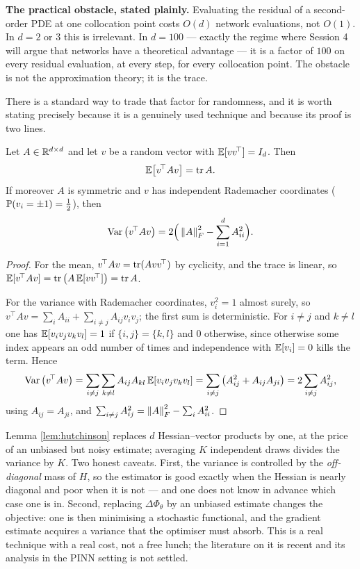 \documentclass[11pt,a4paper]{article}
\begin{document}
\begin{keybox}
\textbf{The practical obstacle, stated plainly.} Evaluating the residual of a second-order PDE at
one collocation point costs $O(d)$ network evaluations, not $O(1)$. In $d = 2$ or $3$ this is
irrelevant. In $d = 100$ --- exactly the regime where Session 4 will argue that networks have a
theoretical advantage --- it is a factor of $100$ on every residual evaluation, at every step, for
every collocation point. The obstacle is not the approximation theory; it is the trace.
\end{keybox}

There is a standard way to trade that factor for randomness, and it is worth stating precisely
because it is a genuinely used technique and because its proof is two lines.

\begin{lemma}\label{lem:hutchinson}
Let $A \in \mathbb{R}^{d\times d}$ and let $v$ be a random vector with $\mathbb{E}[vv^{\!\top}] = I_d$. Then
\[
\mathbb{E}\big[ v^{\!\top} A v \big] = \operatorname{tr} A .
\]
If moreover $A$ is symmetric and $v$ has independent Rademacher coordinates
($\mathbb{P}(v_i = \pm 1) = \tfrac12$), then
\[
\operatorname{Var}\big( v^{\!\top} A v \big) = 2 \Big( \left\lVert A \right\rVert_F^2 - \sum_{i=1}^d A_{ii}^2 \Big).
\]
\end{lemma}

\begin{proof}
For the mean, $v^{\!\top}Av = \operatorname{tr}(A v v^{\!\top})$ by cyclicity, and the trace is linear, so
$\mathbb{E}[v^{\!\top}Av] = \operatorname{tr}\big(A\,\mathbb{E}[vv^{\!\top}]\big) = \operatorname{tr} A$.

For the variance with Rademacher coordinates, $v_i^2 = 1$ almost surely, so
$v^{\!\top}Av = \sum_i A_{ii} + \sum_{i \ne j} A_{ij} v_i v_j$; the first sum is deterministic.
For $i \ne j$ and $k \ne l$ one has $\mathbb{E}[v_iv_jv_kv_l] = 1$ if $\{i,j\} = \{k,l\}$ and $0$ otherwise,
since otherwise some index appears an odd number of times and independence with $\mathbb{E}[v_i] = 0$ kills
the term. Hence
\[
\operatorname{Var}\big(v^{\!\top}Av\big) = \sum_{i \ne j}\sum_{k \ne l} A_{ij}A_{kl}\,\mathbb{E}[v_iv_jv_kv_l]
= \sum_{i\ne j} \big( A_{ij}^2 + A_{ij}A_{ji} \big) = 2\sum_{i \ne j} A_{ij}^2,
\]
using $A_{ij} = A_{ji}$, and $\sum_{i\ne j}A_{ij}^2 = \left\lVert A \right\rVert_F^2 - \sum_i A_{ii}^2$.
\end{proof}

\begin{remark}
Lemma \ref{lem:hutchinson} replaces $d$ Hessian--vector products by one, at the price of an unbiased
but noisy estimate; averaging $K$ independent draws divides the variance by $K$. Two honest
caveats. First, the variance is controlled by the \emph{off-diagonal} mass of $H$, so the estimator
is good exactly when the Hessian is nearly diagonal and poor when it is not --- and one does not
know in advance which case one is in. Second, replacing $\Delta\Phi_\theta$ by an unbiased estimate
changes the objective: one is then minimising a stochastic functional, and the gradient estimate
acquires a variance that the optimiser must absorb. This is a real technique with a real cost, not a
free lunch; the literature on it is recent and its analysis in the PINN setting is not settled.
\end{remark}
\end{document}
